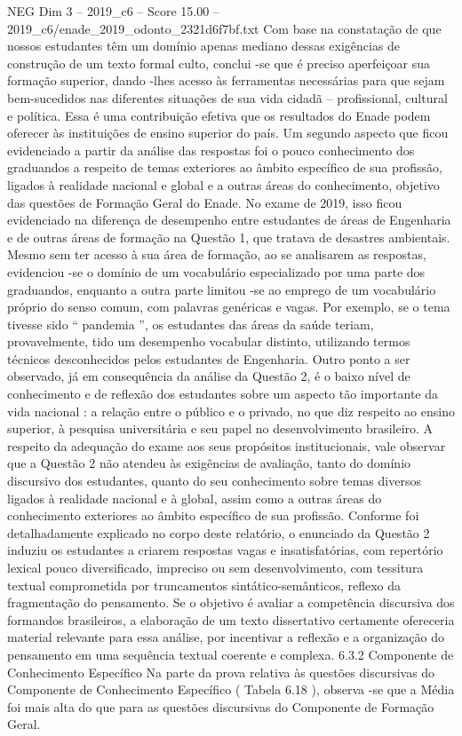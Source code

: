 \begin{textsample}{NEG Dim 3 – 2019\_c6 – Score 15.00 – 2019\_c6/enade\_2019\_odonto\_2321d6f7bf.txt}
Com base na constatação de que nossos estudantes têm um domínio apenas mediano dessas exigências de construção de um texto formal culto, conclui -se que é preciso aperfeiçoar sua formação superior, dando -lhes acesso às ferramentas necessárias para que sejam bem-sucedidos nas diferentes situações de sua vida cidadã – profissional, cultural e política.
Essa é uma contribuição efetiva que os resultados do Enade podem oferecer às instituições de ensino superior do país.
Um segundo aspecto que ficou evidenciado a partir da análise das respostas foi o pouco conhecimento dos graduandos a respeito de temas exteriores ao âmbito específico de sua profissão, ligados à realidade nacional e global e a outras áreas do conhecimento, objetivo das questões de Formação Geral do Enade.
No exame de 2019, isso ficou evidenciado na diferença de desempenho entre estudantes de áreas de Engenharia e de outras áreas de formação na Questão 1, que tratava de desastres ambientais.
Mesmo sem ter acesso à sua área de formação, ao se analisarem as respostas, evidenciou -se o domínio de um vocabulário especializado por uma parte dos graduandos, enquanto a outra parte limitou -se ao emprego de um vocabulário próprio do senso comum, com palavras genéricas e vagas.
Por exemplo, se o tema tivesse sido “ pandemia ”, os estudantes das áreas da saúde teriam, provavelmente, tido um desempenho vocabular distinto, utilizando termos técnicos desconhecidos pelos estudantes de Engenharia.
Outro ponto a ser observado, já em consequência da análise da Questão 2, é o baixo nível de conhecimento e de reflexão dos estudantes sobre um aspecto tão importante da vida nacional : a relação entre o público e o privado, no que diz respeito ao ensino superior, à pesquisa universitária e seu papel no desenvolvimento brasileiro.
A respeito da adequação do exame aos seus propósitos institucionais, vale observar que a Questão 2 não atendeu às exigências de avaliação, tanto do domínio discursivo dos estudantes, quanto do seu conhecimento sobre temas diversos ligados à realidade nacional e à global, assim como a outras áreas do conhecimento exteriores ao âmbito específico de sua profissão.
Conforme foi detalhadamente explicado no corpo deste relatório, o enunciado da Questão 2 induziu os estudantes a criarem respostas vagas e insatisfatórias, com repertório lexical pouco diversificado, impreciso ou sem desenvolvimento, com tessitura textual comprometida por truncamentos sintático-semânticos, reflexo da fragmentação do pensamento.
Se o objetivo é avaliar a competência discursiva dos formandos brasileiros, a elaboração de um texto dissertativo certamente ofereceria material relevante para essa análise, por incentivar a reflexão e a organização do pensamento em uma sequência textual coerente e complexa. 6.3.2 Componente de Conhecimento Específico Na parte da prova relativa às questões discursivas do Componente de Conhecimento Específico ( Tabela 6.18 ), observa -se que a Média foi mais alta do que para as questões discursivas do Componente de Formação Geral.

\end{textsample}
